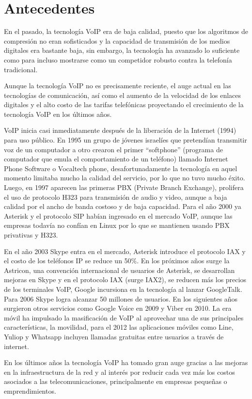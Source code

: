 \section{Antecedentes}
	
	En el pasado, la tecnología VoIP era de baja calidad, puesto que los algoritmos 
	de compresión no eran sofisticados y la capacidad de transmisión de los medios 
	digitales era bastante baja, sin embargo, la tecnología ha avanzado lo suficiente 
	como para incluso mostrarse como un competidor robusto contra la telefonía tradicional.
	 
	Aunque la tecnología VoIP no es precisamente reciente, el auge actual en las tecnologías 
	de comunicación, así como el aumento de la velocidad de los enlaces digitales y el alto 
	costo de las tarifas telefónicas proyectando el crecimiento de la tecnología VoIP en los últimos años.
	
	VoIP inicia casi inmediatamente después de la liberación de la Internet (1994) para uso público. 
	En 1995 un grupo de jóvenes israelíes que pretendían transmitir voz de un computador a 
	otro crearon el primer “softphone” (programa de computador que emula el comportamiento 
	de un teléfono) llamado Internet Phone Software o Vocaltech phone, desafortunadamente 
	la tecnología en aquel momento limitaba mucho la calidad del servicio, por lo que no 
	tuvo mucho éxito. Luego, en 1997 aparecen las primeras PBX (Private Branch Exchange), 
	prolifera el uso de protocolo H323 para transmisión de audio y video, aunque a baja 
	calidad por el ancho de banda costoso y de baja capacidad. Para el año 2000 ya Asterisk 
	y el protocolo SIP habían ingresado en el mercado VoIP, aunque las empresas todavía no 
	confían en Linux por lo que se mantienen usando PBX privativas y H323. 
	
	En el año 2003 Skype entra en el mercado, Asterisk introduce el protocolo IAX y el 
	costo de los teléfonos IP se reduce un 50\%. En los próximos años surge la Astricon, 
	una convención internacional de usuarios de Asterisk, se desarrollan mejoras en Skype 
	y en el protocolo IAX (surge IAX2), se reducen más los precios de los terminales VoIP, 
	Google incursiona en la tecnología al lanzar GoogleTalk. Para 2006 Skype logra alcanzar 
	50 millones de usuarios. En los siguientes años surgieron otros servicios como Google 
	Voice en 2009 y Viber en 2010. La era móvil ha impulsado la masificación de VoIP al 
	aprovechar una de sus principales características, la movilidad, para el 2012 las 
	aplicaciones móviles como Line, Yuliop y Whatsapp incluyen llamadas gratuitas entre 
	usuarios a través de internet. 
	
	En los últimos años la tecnología VoIP ha tomado gran auge gracias a las mejoras 
	en la infraestructura de la red y al interés por reducir cada vez más los costos 
	asociados a las telecomunicaciones, principalmente en empresas pequeñas o 
	emprendimientos.